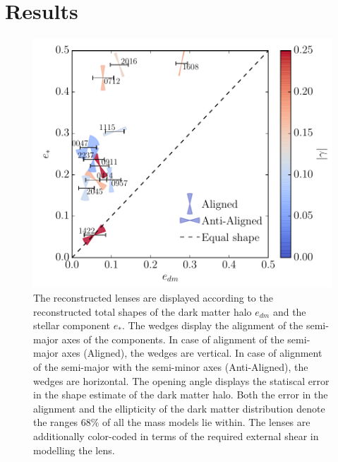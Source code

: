 \documentclass[useAMS,usenatbib]{mn2e}
\begin{document}
\section{Results}\label{sec:results}
\begin{figure}
  \centering
  \includegraphics[width=.8\linewidth]{Figures/wedges_shears.pdf}
  \caption[width=\linewidth]{The reconstructed lenses are displayed according to the reconstructed total shapes of the dark matter halo $e_{dm}$ and the stellar component $e_{*}$. The wedges display the alignment of the semi-major axes of the components. In case of alignment of the semi-major axes (Aligned), the wedges are vertical. In case of alignment of the semi-major with the semi-minor axes (Anti-Aligned), the wedges are horizontal. The opening angle displays the statiscal error in the shape estimate of the dark matter halo. Both the error in the alignment and the ellipticity of the dark matter distribution denote the ranges $68\%$ of all the mass models lie within. The lenses are additionally color-coded in terms of the required external shear in modelling the lens.}
  \label{fig:wedgesall}
\end{figure}
\end{document}
